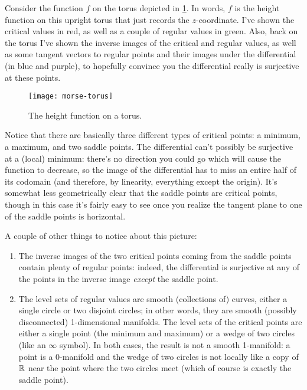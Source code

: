 \begin{example}
	Consider the function $f$ on the torus depicted in \cref{fig:morse-torus}. In words, $f$ is the height function on this upright torus that just records the $z$-coordinate. I've shown the critical values in red, as well as a couple of regular values in green. Also, back on the torus I've shown the inverse images of the critical and regular values, as well as some tangent vectors to regular points and their images under the differential (in blue and purple), to hopefully convince you the differential really is surjective at these points.
	
	\begin{figure}[htbp]
		\centering
			\texttt{[image: morse-torus]}
		\caption{The height function on a torus.}
		\label{fig:morse-torus}
	\end{figure}
	
	Notice that there are basically three different types of critical points: a minimum, a maximum, and two saddle points. The differential can't possibly be surjective at a (local) minimum: there's no direction you could go which will cause the function to decrease, so the image of the differential has to miss an entire half of its codomain (and therefore, by linearity, everything except the origin). It's somewhat less geometrically clear that the saddle points are critical points, though in this case it's fairly easy to see once you realize the tangent plane to one of the saddle points is horizontal.
	
	A couple of other things to notice about this picture:
	\begin{enumerate}
		\item The inverse images of the two critical points coming from the saddle points contain plenty of regular points: indeed, the differential is surjective at any of the points in the inverse image \emph{except} the saddle point.
		
		\item The level sets of regular values are smooth (collections of) curves, either a single circle or two disjoint circles; in other words, they are smooth (possibly disconnected) 1-dimensional manifolds. The level sets of the critical points are either a single point (the minimum and maximum) or a wedge of two circles (like an $\infty$ symbol). In both cases, the result is not a smooth 1-manifold: a point is a 0-manifold and the wedge of two circles is not locally like a copy of $\mathbb{R}$ near the point where the two circles meet (which of course is exactly the saddle point).
	\end{enumerate}
\end{example}

